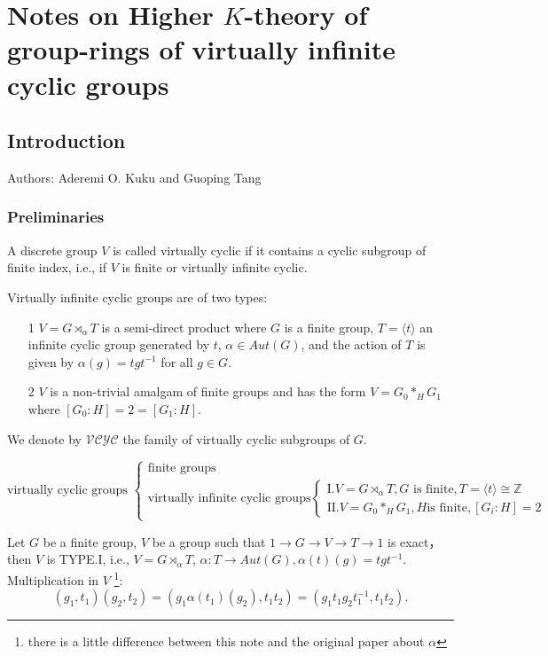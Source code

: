 \chapter{Notes on Higher $K$-theory of group-rings of virtually infinite cyclic groups}
\section{Introduction}
Authors: Aderemi O. Kuku and Guoping Tang
\subsection{Preliminaries}
\begin{definition}
A discrete group $V$ is called virtually cyclic if it contains a cyclic subgroup of finite index, i.e., if $V$ is finite or virtually infinite cyclic.
\end{definition}
Virtually infinite cyclic groups are of two types:
\begin{itemize}
 	\item[1]  $V = G \rtimes_{\alpha} T$ is a semi-direct product where $G$ is a finite group, $T = \langle t \rangle$ an infinite cyclic group generated by $t$, $\alpha \in Aut(G)$, and the action of $T$ is given by $\alpha(g )= tgt^{-1}$ for all $g\in G$.
 	\item[2] $V$ is a non-trivial amalgam of finite groups and has the form $V =G_0 *_H	G_1$ where $[G_0: H ]=2=[ G_1 :H]$.

 \end{itemize}
  We denote by $\mathcal{VCYC}$ the family of virtually cyclic subgroups of $G$.

\begin{equation*}
\text{virtually cyclic groups }
\begin{cases}
\text{finite groups}\\
\text{virtually infinite cyclic groups}
\begin{cases}
\text{I.}V=G\rtimes_\alpha T,G\text{ is finite},T=\langle t\rangle \cong \mathbb{Z} \\
\text{II.}V=G_0\ast_H G_1,H \text{is finite},[G_i:H]=2
\end{cases}
\end{cases}
\end{equation*}

Let $G$ be a finite group, $V$ be a group such that $1\to G\to V\to T\to 1$ is exact，then $V$ is TYPE.I, i.e., $V=G\rtimes_\alpha T$, $\alpha:T\rightarrow Aut(G), \alpha (t)(g)=tgt^{-1}$. Multiplication in $V$ \footnote{there is a little difference between this note and the original paper about $\alpha$}:
\[(g_1,t_1)(g_2,t_2)=(g_1\alpha(t_1)(g_2),t_1t_2)=(g_1t_1g_2t_1^{-1},t_1t_2).\]

